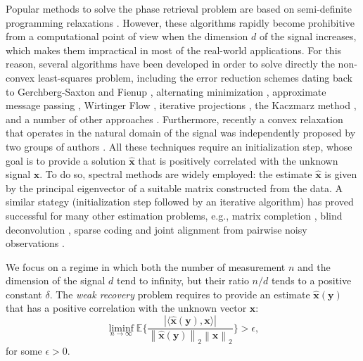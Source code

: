 \documentclass[final,12pt]{colt2018}
\newcommand{\norm}[1]{\left\lVert#1\right\rVert}
\def\bx{{\boldsymbol x}}
\def\by{{\boldsymbol y}}
\def\E{{\mathbb E}}
\begin{document}
Popular methods to solve the phase retrieval problem are based on semi-definite programming relaxations \citep{candes2015phase,
  candes2015phase2, candes2013phaselift,  waldspurger2015phase}. However, these algorithms rapidly become prohibitive from a computational point of view when the dimension $d$
of the signal increases, which makes them impractical in most of the real-world applications. For this reason, several algorithms have been
developed in order to solve directly the non-convex least-squares problem, including the error reduction schemes dating back to
Gerchberg-Saxton and Fienup \citep{gerchberg1972practical, phFienup}, alternating minimization \citep{netrapalli2013phase}, 
approximate message passing \citep{schniter2015compressive}, Wirtinger Flow \citep{candes2015wirt}, iterative projections \citep{li2015phase}, the Kaczmarz method
\citep{wei2015solving}, and a number of other approaches \citep{chen2017solving, zhang2016reshaped, cai2016optimal, wang2016solving, wang2016solvingnips, soltanolkotabi2017structured,duchi2017solving, wang2017solving}. Furthermore, recently a convex relaxation that operates in the natural domain of the signal was independently proposed by two groups of authors \citep{goldstein2016phasemax, bahmani17a}. All these techniques require an initialization step, whose goal is to provide a solution $\hat{\bx}$ that is positively correlated with the unknown signal $\bx$. To do so, spectral methods are widely employed: the estimate $\hat{\bx}$ is given by the principal eigenvector of a suitable matrix constructed from the data. 
A similar stategy (initialization step followed by an iterative algorithm) has proved successful for many other estimation problems, e.g., matrix completion \citep{keshavan2010matrix, jain2013low}, blind deconvolution \citep{lee2017blind, li2016rapid}, sparse coding \citep{arora2015simple} and joint alignment from pairwise noisy observations \citep{chen2016projected}. 

We focus on a regime in which both the number of measurement $n$ and the dimension of the signal $d$ tend to infinity, but their ratio $n/d$ 
tends to a positive constant $\delta$. The \emph{weak recovery} problem requires to provide an estimate $\hat{\bx}(\by)$ that has a positive correlation with the unknown vector $\bx$:
%
\begin{equation}\label{eq:poscorr}
\liminf_{n\to\infty}\E\bigg\{\frac{|\langle\hat{\bx}(\by), \bx\rangle|}{\norm{\hat{\bx}(\by)}_2 \norm{\bx}_2} \bigg\}> \epsilon,
\end{equation}
for some $\epsilon >0$. 
\end{document}

